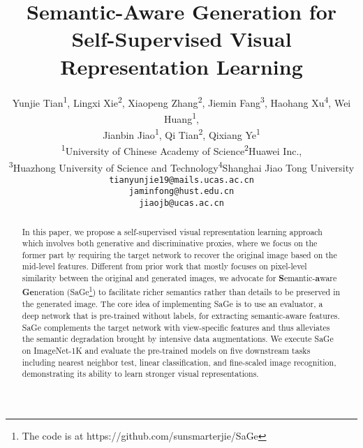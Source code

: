 \documentclass[10pt,twocolumn,letterpaper]{article}
\begin{document}
\title{Semantic-Aware Generation for Self-Supervised Visual Representation Learning}

\author{Yunjie Tian\textsuperscript{1}, Lingxi Xie\textsuperscript{2}, Xiaopeng Zhang\textsuperscript{2}, Jiemin Fang\textsuperscript{3}, Haohang Xu\textsuperscript{4}, Wei Huang\textsuperscript{1},\\
Jianbin Jiao\textsuperscript{1}, Qi Tian\textsuperscript{2}, Qixiang Ye\textsuperscript{1}\\
\textsuperscript{1}University of Chinese Academy of Science\quad \textsuperscript{2}Huawei Inc.,\\
\textsuperscript{3}Huazhong University of Science and Technology\quad\textsuperscript{4}Shanghai Jiao Tong University\\
{\tt\small tianyunjie19@mails.ucas.ac.cn}\\
{\tt\small jaminfong@hust.edu.cn}\\
{\tt\small jiaojb@ucas.ac.cn}
}
\maketitle

\begin{abstract}
In this paper, we propose a self-supervised visual representation learning approach which involves both generative and discriminative proxies, where we focus on the former part by requiring the target network to recover the original image based on the mid-level features. Different from prior work that mostly focuses on pixel-level similarity between the original and generated images, we advocate for \textbf{S}emantic-\textbf{a}ware \textbf{Ge}neration (SaGe\footnote{The code is at \textsf{https://github.com/sunsmarterjie/SaGe}}) to facilitate richer semantics rather than details to be preserved in the generated image. The core idea of implementing SaGe is to use an evaluator, a deep network that is pre-trained without labels, for extracting semantic-aware features. SaGe complements the target network with view-specific features and thus alleviates the semantic degradation brought by intensive data augmentations. We execute SaGe on ImageNet-1K and evaluate the pre-trained models on five downstream tasks including nearest neighbor test, linear classification, and fine-scaled image recognition, demonstrating its ability to learn stronger visual representations.
\end{abstract}
\end{document}
